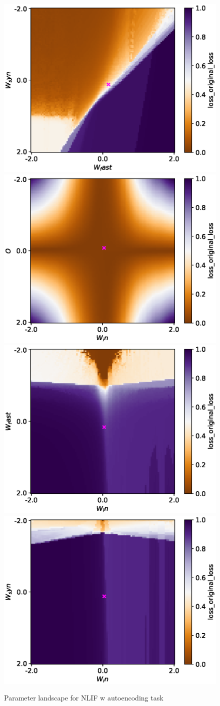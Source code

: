 \documentclass[mphil,deptreport,ianc]{infthesis} %
\begin{document}
\begin{figure}
    \centering
    \includegraphics[width=0.49\columnwidth]{figures/param_landscape_heatmaps/gating/NLIF/test_export_2d_heatmap_N_4_loss_original_loss_W_fast_W_syn.eps}
    \includegraphics[width=0.49\columnwidth]{figures/param_landscape_heatmaps/gating/NLIF/test_export_2d_heatmap_N_4_loss_original_loss_W_in_O.eps}
    \includegraphics[width=0.49\columnwidth]{figures/param_landscape_heatmaps/gating/NLIF/test_export_2d_heatmap_N_4_loss_original_loss_W_in_W_fast.eps}
    \includegraphics[width=0.49\columnwidth]{figures/param_landscape_heatmaps/gating/NLIF/test_export_2d_heatmap_N_4_loss_original_loss_W_in_W_syn.eps}
    \caption{Parameter landscape for NLIF w autoencoding task}
    \label{fig:p_landscape_NLIF_autoencoding}
\end{figure}
\end{document}
